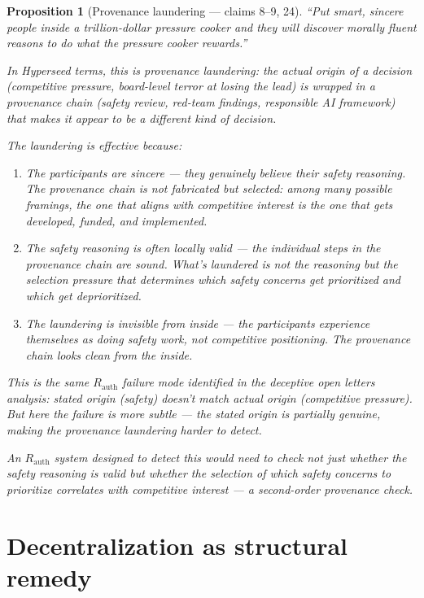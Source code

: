 \documentclass[11pt,a4paper]{article}
\newtheorem{proposition}[definition]{Proposition}
\begin{document}
\begin{proposition}[Provenance laundering --- claims 8--9, 24]
\label{prop:laundering}
``Put smart, sincere people inside a trillion-dollar pressure cooker
and they will discover morally fluent reasons to do what the pressure
cooker rewards.''

In Hyperseed terms, this is \emph{provenance laundering}: the actual
origin of a decision (competitive pressure, board-level terror at
losing the lead) is wrapped in a provenance chain (safety review,
red-team findings, responsible AI framework) that makes it appear to
be a different kind of decision.

The laundering is effective because:
\begin{enumerate}
\item The participants are sincere --- they genuinely believe their
  safety reasoning. The provenance chain is not fabricated but
  \emph{selected}: among many possible framings, the one that
  aligns with competitive interest is the one that gets developed,
  funded, and implemented.
\item The safety reasoning is often locally valid --- the individual
  steps in the provenance chain are sound. What's laundered is not
  the reasoning but the \emph{selection pressure} that determines
  which safety concerns get prioritized and which get deprioritized.
\item The laundering is invisible from inside --- the participants
  experience themselves as doing safety work, not competitive
  positioning. The provenance chain looks clean from the inside.
\end{enumerate}

This is the same $R_{\text{auth}}$ failure mode identified in the
deceptive open letters analysis: stated origin (safety) doesn't
match actual origin (competitive pressure). But here the failure is
more subtle --- the stated origin is \emph{partially} genuine,
making the provenance laundering harder to detect.

An $R_{\text{auth}}$ system designed to detect this would need to
check not just whether the safety reasoning is valid but whether the
\emph{selection} of which safety concerns to prioritize correlates
with competitive interest --- a second-order provenance check.
\end{proposition}


\section{Decentralization as structural remedy}
\label{sec:decentral}
\end{document}
